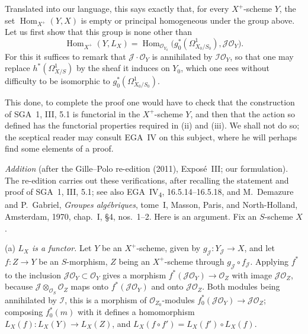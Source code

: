 Translated into our language, this says exactly that, for every
\(X^+\)-scheme \(Y\), the set \(\operatorname{Hom}_{X^+}(Y,X)\) is empty or
principal homogeneous under the group above. Let us first show that this
group is none other than
\[
 \operatorname{Hom}_{X^+}(Y,L_X)
 =\operatorname{Hom}_{\mathscr O_{Y_0}}
 \bigl(g_0^*(\Omega^1_{X_0/S_0}),\mathscr J\mathscr O_Y\bigr).
\]
For this it suffices to remark that \(\mathscr J\cdot\mathscr O_Y\) is
annihilated by \(\mathscr I\mathscr O_Y\), so that one may replace
\(h^*(\Omega^1_{X/S})\) by the sheaf it induces on \(Y_0\), which one sees
without difficulty to be isomorphic to \(g_0^*(\Omega^1_{X_0/S_0})\).

This done, to complete the proof one would have to check that the
construction of SGA~1, III, 5.1 is functorial in the \(X^+\)-scheme \(Y\),
and then that the action so defined has the functorial properties required
in (ii) and (iii). We shall not do so; the sceptical reader may consult EGA~IV
on this subject, where he will perhaps find some elements of a proof.

\emph{Addition} (after the Gille--Polo re-edition (2011), Exposé~III; our
formulation). The re-edition carries out these verifications, after
recalling the statement and proof of SGA~1, III, 5.1; see also
EGA~IV\textsubscript{4}, 16.5.14--16.5.18, and M.~Demazure and P.~Gabriel,
\emph{Groupes algébriques}, tome~I, Masson, Paris, and North-Holland,
Amsterdam, 1970, chap.~I, \S4, nos.~1--2. Here is an argument. Fix an
\(S\)-scheme \(X\).

(a) \emph{\(L_X\) is a functor.} Let \(Y\) be an \(X^+\)-scheme, given by
\(g_{\mathscr J}\colon Y_{\mathscr J}\to X\), and let \(f\colon Z\to Y\) be an
\(S\)-morphism, \(Z\) being an \(X^+\)-scheme through
\(g_{\mathscr J}\circ f_{\mathscr J}\). Applying \(f^*\) to the inclusion
\(\mathscr J\mathscr O_Y\subset\mathscr O_Y\) gives a morphism
\(f^*(\mathscr J\mathscr O_Y)\to\mathscr O_Z\) with image
\(\mathscr J\mathscr O_Z\), because
\(\mathscr J\otimes_{\mathscr O_S}\mathscr O_Z\) maps onto
\(f^*(\mathscr J\mathscr O_Y)\) and onto \(\mathscr J\mathscr O_Z\). Both
modules being annihilated by \(\mathscr I\), this is a morphism of
\(\mathscr O_{Z_0}\)-modules
\(f_0^*(\mathscr J\mathscr O_Y)\to\mathscr J\mathscr O_Z\); composing
\(f_0^*(m)\) with it defines a homomorphism
\(L_X(f)\colon L_X(Y)\to L_X(Z)\), and
\(L_X(f\circ f')=L_X(f')\circ L_X(f)\).

